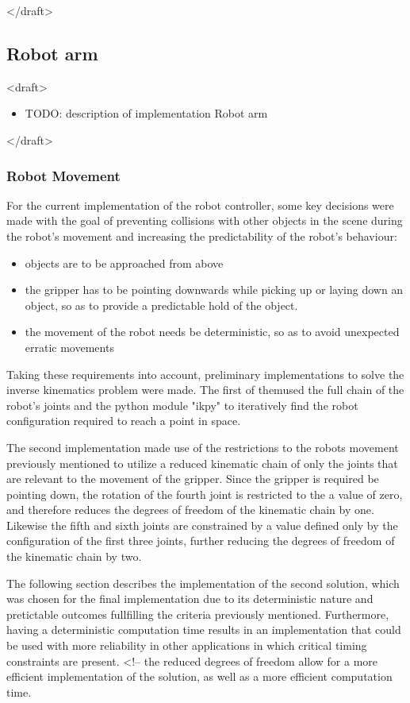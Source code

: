 </draft>

\subsection{Robot arm}

<draft>
\begin{itemize}
    \item TODO: description of implementation Robot arm
\end{itemize}
</draft>

\subsubsection{Robot Movement}

For the current implementation of the robot controller, some key decisions were made with the goal of preventing collisions with other objects in the scene during the robot's movement and increasing the predictability of the robot's behaviour:

\begin{itemize}
    \item objects are to be approached from above
    \item the gripper has to be pointing downwards while picking up or laying down an object, so as to provide a predictable hold of the object.
    \item the movement of the robot needs be deterministic, so as to avoid unexpected erratic movements
\end{itemize}

Taking these requirements into account, preliminary implementations to solve the inverse kinematics problem were made. The first of themused the full chain of the robot's joints and the python module "ikpy" to iteratively find the robot configuration required to reach a point in space.

The second implementation made use of the restrictions to the robots movement previously mentioned to utilize a reduced kinematic chain of only the joints that are relevant to the movement of the gripper.
Since the gripper is required be pointing down, the rotation of the fourth joint is restricted to the a value of zero, and therefore reduces the degrees of freedom of the kinematic chain by one. Likewise the fifth and sixth joints are constrained by a value defined only by the configuration of the first three joints, further reducing the degrees of freedom of the kinematic chain by two.

The following section describes the implementation of the second solution, which was chosen for the final implementation due to its deterministic nature and pretictable outcomes fullfilling the criteria previously mentioned. Furthermore, having a deterministic computation time results in an implementation that could be used with more reliability in other applications in which critical timing constraints are present.
<!-- 
the reduced degrees of freedom allow for a more efficient implementation of the solution, as well as a more efficient computation time.


